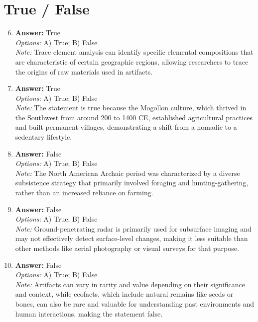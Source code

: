 \documentclass[12pt]{article}
\begin{document}
\section*{True / False}
\begin{enumerate}[label=\arabic*.]
\setcounter{enumi}{5}
\item \textbf{Answer:} True
\\ \textit{Options:} A) True; B) False
\\ \textit{Note:} Trace element analysis can identify specific elemental compositions that are characteristic of certain geographic regions, allowing researchers to trace the origins of raw materials used in artifacts.
\item \textbf{Answer:} True
\\ \textit{Options:} A) True; B) False
\\ \textit{Note:} The statement is true because the Mogollon culture, which thrived in the Southwest from around 200 to 1400 CE, established agricultural practices and built permanent villages, demonstrating a shift from a nomadic to a sedentary lifestyle.
\item \textbf{Answer:} False
\\ \textit{Options:} A) True; B) False
\\ \textit{Note:} The North American Archaic period was characterized by a diverse subsistence strategy that primarily involved foraging and hunting-gathering, rather than an increased reliance on farming.
\item \textbf{Answer:} False
\\ \textit{Options:} A) True; B) False
\\ \textit{Note:} Ground-penetrating radar is primarily used for subsurface imaging and may not effectively detect surface-level changes, making it less suitable than other methods like aerial photography or visual surveys for that purpose.
\item \textbf{Answer:} False
\\ \textit{Options:} A) True; B) False
\\ \textit{Note:} Artifacts can vary in rarity and value depending on their significance and context, while ecofacts, which include natural remains like seeds or bones, can also be rare and valuable for understanding past environments and human interactions, making the statement false.
\end{enumerate}
\end{document}
